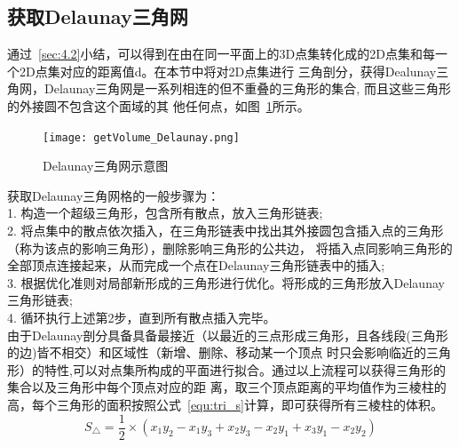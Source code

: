 \subsection{获取Delaunay三角网}
\label{sec:4.4.3}
通过~\ref{sec:4.2}小结，可以得到在由在同一平面上的3D点集转化成的2D点集和每一个2D点集对应的距离值d。在本节中将对2D点集进行
三角剖分，获得Dealunay三角网，Delaunay三角网是一系列相连的但不重叠的三角形的集合, 而且这些三角形的外接圆不包含这个面域的其
他任何点，如图~\ref{fig:getVolume_Delaunay}所示。
\begin{figure}[H] %
  \centering
  \texttt{[image: getVolume\_Delaunay.png]}
  \caption{Delaunay三角网示意图}
  \label{fig:getVolume_Delaunay}
\end{figure}
获取Delaunay三角网格的一般步骤为：\\
1.	构造一个超级三角形，包含所有散点，放入三角形链表;\\
2.	将点集中的散点依次插入，在三角形链表中找出其外接圆包含插入点的三角形（称为该点的影响三角形），删除影响三角形的公共边，
将插入点同影响三角形的全部顶点连接起来，从而完成一个点在Delaunay三角形链表中的插入;\\
3.	根据优化准则对局部新形成的三角形进行优化。将形成的三角形放入Delaunay三角形链表;\\
4.	循环执行上述第2步，直到所有散点插入完毕。\\
由于Delaunay剖分具备具备最接近（以最近的三点形成三角形，且各线段(三角形的边)皆不相交）和区域性（新增、删除、移动某一个顶点
时只会影响临近的三角形）的特性,可以对点集所构成的平面进行拟合。通过以上流程可以获得三角形的集合以及三角形中每个顶点对应的距
离，取三个顶点距离的平均值作为三棱柱的高，每个三角形的面积按照公式~\ref{equ:tri_s}计算，即可获得所有三棱柱的体积。
\begin{equation}
S_\bigtriangleup=\frac12\times\left(x_1y_2-x_1y_3+x_2y_3-x_2y_1+x_3y_1-x_2y_2\right)\label{equ:tri_s}
\end{equation}
